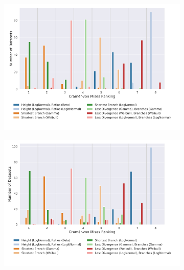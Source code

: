 \documentclass[10pt,letterpaper]{article}
\begin{document}
\begin{figure}
	\caption{How often a specific method ranks at a certain position when its Cramér-von Mises criterion is compared to the other methods. For example, the height ratio embedding with the beta distribution ranked first for almost all datasets. (The lower the rank the better.)}
	
	\centering
	\begin{subfigure}[b]{0.45\textwidth}
		\centering
		\includegraphics[width=\textwidth]{figures/yule-100-ccd1-cvm-ranking.png}
	\end{subfigure}
	\begin{subfigure}[b]{0.45\textwidth}
		\centering
		\includegraphics[width=\textwidth]{figures/yule-200-ccd1-cvm-ranking.png}
	\end{subfigure}
	

\end{figure}
\end{document}
